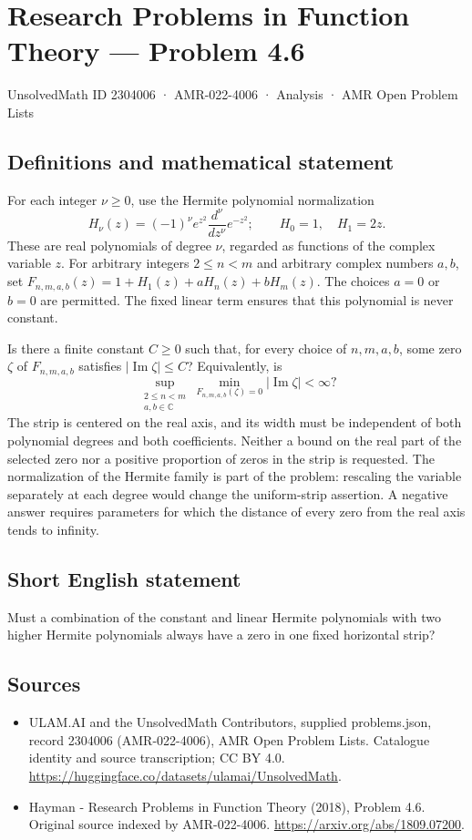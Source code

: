 \documentclass[11pt,a4paper]{article}
\begin{document}
\section*{Research Problems in Function Theory — Problem 4.6}\label{2304006}
{\small UnsolvedMath ID 2304006 · AMR-022-4006 · Analysis · AMR Open Problem Lists}
\subsection{Definitions and mathematical statement}
For each integer $\nu\geq0$, use the Hermite polynomial normalization
\[
 H_\nu(z)=(-1)^\nu e^{z^2}
                \frac{d^\nu}{dz^\nu}e^{-z^2};
 \qquad H_0=1,\quad H_1=2z.
\]
These are real polynomials of degree $\nu$, regarded as functions of
the complex variable $z$. For arbitrary integers $2\leq n<m$ and
arbitrary complex numbers $a,b$, set
$F_{n,m,a,b}(z)=1+H_1(z)+aH_n(z)+bH_m(z)$.
The choices $a=0$ or $b=0$ are permitted. The fixed linear term
ensures that this polynomial is never constant.

Is there a finite constant $C\geq0$ such that, for every choice of
$n,m,a,b$, some zero $\zeta$ of $F_{n,m,a,b}$ satisfies
$|\operatorname{Im}\zeta|\leq C$? Equivalently, is
\[
 \sup_{\substack{2\leq n<m\\a,b\in\mathbb C}}
     \min_{F_{n,m,a,b}(\zeta)=0}|\operatorname{Im}\zeta|<\infty?
\]
The strip is centered on the real axis, and its width must be
independent of both polynomial degrees and both coefficients.
Neither a bound on the real part of the selected zero nor a
positive proportion of zeros in the strip is requested.
The normalization of the Hermite family is part of the problem:
rescaling the variable separately at each degree would change the
uniform-strip assertion. A negative answer requires parameters for
which the distance of every zero from the real axis tends to infinity.
\subsection{Short English statement}
Must a combination of the constant and linear Hermite polynomials with two higher Hermite polynomials always have a zero in one fixed horizontal strip?
\subsection{Sources}
\begin{itemize}
\item[S1] ULAM.AI and the UnsolvedMath Contributors, supplied problems.json, record 2304006 (AMR-022-4006), AMR Open Problem Lists. Catalogue identity and source transcription; CC BY 4.0.
\url{https://huggingface.co/datasets/ulamai/UnsolvedMath}.
\item[S2] Hayman - Research Problems in Function Theory (2018), Problem 4.6. Original source indexed by AMR-022-4006.
\url{https://arxiv.org/abs/1809.07200}.
\end{itemize}
\end{document}
